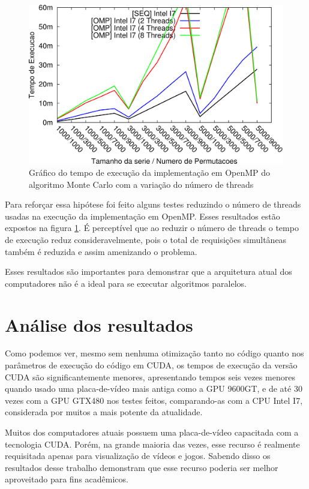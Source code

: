 \begin{figure}[H]
\centering
\includegraphics[]{Imagens/graficos_mcarlo/mcarlo_omp-threads.png}
\caption{Gráfico do tempo de execução da implementação em OpenMP do algoritmo Monte Carlo com a variação do número de threads}
\label{fig:grafico_mcarlo_omp_threads}
\end{figure}

Para reforçar essa hipótese foi feito alguns testes reduzindo o número de threads usadas na execução da implementação em OpenMP. Esses resultados estão expostos na figura \ref{fig:grafico_mcarlo_omp_threads}. É perceptível que ao reduzir o número de threads o tempo de execução reduz consideravelmente, pois o total de requisições simultâneas também é reduzida e assim amenizando o problema.

Esses resultados são importantes para demonstrar que a arquitetura atual dos computadores não é a ideal para se executar algoritmos paralelos.

\section{Análise dos resultados}

Como podemos ver, mesmo sem nenhuma otimização tanto no código quanto nos parâmetros de execução do código em CUDA, os tempos de execução da versão CUDA são significantemente menores, apresentando tempos seis vezes menores quando usado uma placa-de-vídeo mais antiga como a GPU 9600GT, e de até 30 vezes com a GPU GTX480 nos testes feitos, comparando-as com a CPU Intel I7, considerada por muitos a mais potente da atualidade.

Muitos dos computadores atuais possuem uma placa-de-vídeo capacitada com a tecnologia CUDA. Porém, na grande maioria das vezes, esse recurso é realmente requisitada apenas para visualização de vídeos e jogos. Sabendo disso os resultados desse trabalho demonstram que esse recurso poderia ser melhor aproveitado para fins acadêmicos.